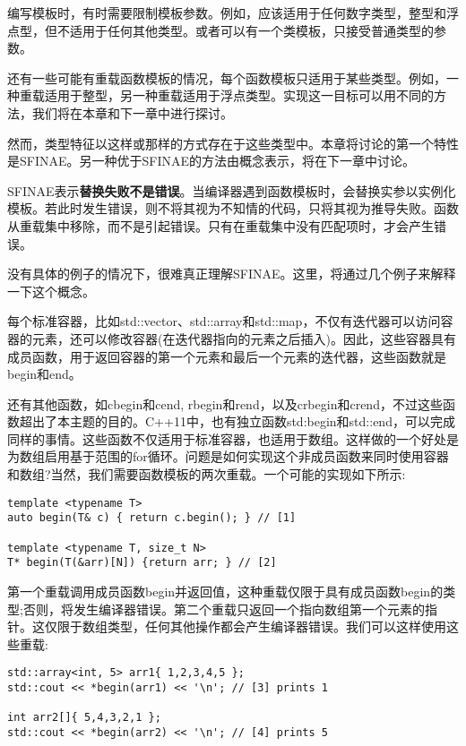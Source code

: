 编写模板时，有时需要限制模板参数。例如，应该适用于任何数字类型，整型和浮点型，但不适用于任何其他类型。或者可以有一个类模板，只接受普通类型的参数。

还有一些可能有重载函数模板的情况，每个函数模板只适用于某些类型。例如，一种重载适用于整型，另一种重载适用于浮点类型。实现这一目标可以用不同的方法，我们将在本章和下一章中进行探讨。

然而，类型特征以这样或那样的方式存在于这些类型中。本章将讨论的第一个特性是SFINAE。另一种优于SFINAE的方法由概念表示，将在下一章中讨论。

SFINAE表示\textbf{替换失败不是错误}。当编译器遇到函数模板时，会替换实参以实例化模板。若此时发生错误，则不将其视为不知情的代码，只将其视为推导失败。函数从重载集中移除，而不是引起错误。只有在重载集中没有匹配项时，才会产生错误。

没有具体的例子的情况下，很难真正理解SFINAE。这里，将通过几个例子来解释一下这个概念。

每个标准容器，比如std::vector、std::array和std::map，不仅有迭代器可以访问容器的元素，还可以修改容器(在迭代器指向的元素之后插入)。因此，这些容器具有成员函数，用于返回容器的第一个元素和最后一个元素的迭代器，这些函数就是begin和end。

还有其他函数，如cbegin和cend, rbegin和rend，以及crbegin和crend，不过这些函数超出了本主题的目的。C++11中，也有独立函数std:begin和std::end，可以完成同样的事情。这些函数不仅适用于标准容器，也适用于数组。这样做的一个好处是为数组启用基于范围的for循环。问题是如何实现这个非成员函数来同时使用容器和数组?当然，我们需要函数模板的两次重载。一个可能的实现如下所示:

\begin{lstlisting}[style=styleCXX]
template <typename T>
auto begin(T& c) { return c.begin(); } // [1]

template <typename T, size_t N>
T* begin(T(&arr)[N]) {return arr; } // [2]
\end{lstlisting}

第一个重载调用成员函数begin并返回值，这种重载仅限于具有成员函数begin的类型;否则，将发生编译器错误。第二个重载只返回一个指向数组第一个元素的指针。这仅限于数组类型，任何其他操作都会产生编译器错误。我们可以这样使用这些重载:

\begin{lstlisting}[style=styleCXX]
std::array<int, 5> arr1{ 1,2,3,4,5 };
std::cout << *begin(arr1) << '\n'; // [3] prints 1

int arr2[]{ 5,4,3,2,1 };
std::cout << *begin(arr2) << '\n'; // [4] prints 5
\end{lstlisting}

